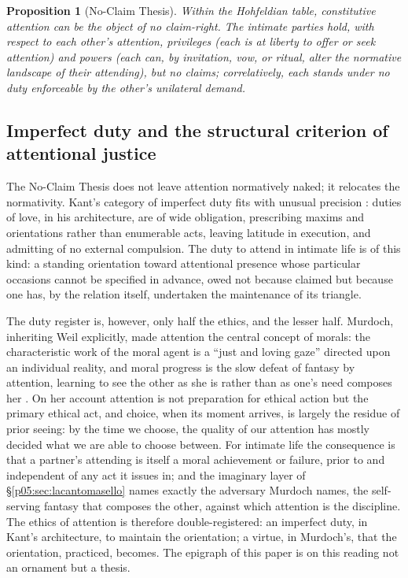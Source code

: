 \documentclass[11pt,a4paper]{article}
\theoremstyle{seriesthm}
\newtheorem{prop}{Proposition}
\begin{document}
\begin{prop}[No-Claim Thesis]\label{p05:prop:noclaim}
Within the Hohfeldian table, constitutive attention can be the object of no claim-right. The intimate parties hold, with respect to each other's attention, privileges (each is at liberty to offer or seek attention) and powers (each can, by invitation, vow, or ritual, alter the normative landscape of their attending), but no claims; correlatively, each stands under no duty enforceable by the other's unilateral demand.
\end{prop}

\subsection{Imperfect duty and the structural criterion of attentional justice}
\label{p05:sec:imperfect}

The No-Claim Thesis does not leave attention normatively naked; it relocates the normativity. Kant's category of imperfect duty fits with unusual precision \parencite{kant1996}: duties of love, in his architecture, are of wide obligation, prescribing maxims and orientations rather than enumerable acts, leaving latitude in execution, and admitting of no external compulsion. The duty to attend in intimate life is of this kind: a standing orientation toward attentional presence whose particular occasions cannot be specified in advance, owed not because claimed but because one has, by the relation itself, undertaken the maintenance of its triangle.

The duty register is, however, only half the ethics, and the lesser half. Murdoch, inheriting Weil explicitly, made attention the central concept of morals: the characteristic work of the moral agent is a ``just and loving gaze'' directed upon an individual reality, and moral progress is the slow defeat of fantasy by attention, learning to see the other as she is rather than as one's need composes her \parencite{murdoch1970}. On her account attention is not preparation for ethical action but the primary ethical act, and choice, when its moment arrives, is largely the residue of prior seeing: by the time we choose, the quality of our attention has mostly decided what we are able to choose between. For intimate life the consequence is that a partner's attending is itself a moral achievement or failure, prior to and independent of any act it issues in; and the imaginary layer of §\ref{p05:sec:lacantomasello} names exactly the adversary Murdoch names, the self-serving fantasy that composes the other, against which attention is the discipline. The ethics of attention is therefore double-registered: an imperfect duty, in Kant's architecture, to maintain the orientation; a virtue, in Murdoch's, that the orientation, practiced, becomes. The epigraph of this paper is on this reading not an ornament but a thesis.
\end{document}

